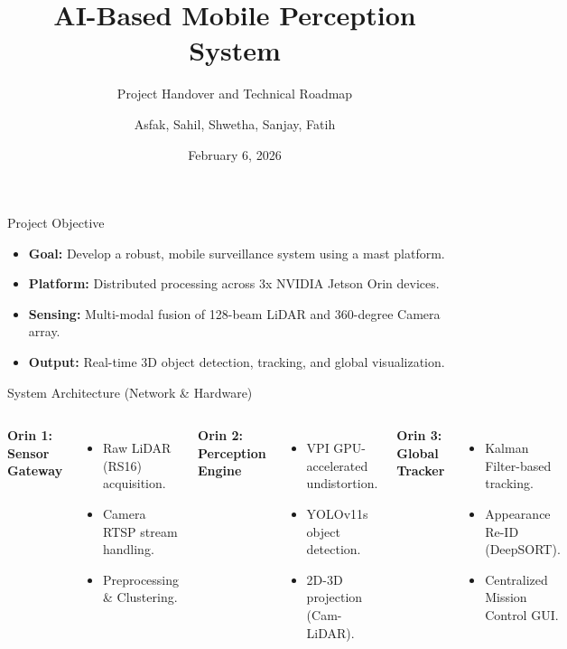 \documentclass[pdf, 10pt]{beamer}
\title[AI Mobile Mast Handover]{AI-Based Mobile Perception System}
\subtitle{Project Handover and Technical Roadmap}
\author[Batch 2025-26]{Asfak, Sahil, Shwetha, Sanjay, Fatih}
\institute[THI]{Technische Hochschule Ingolstadt}
\date[Feb 2026]{February 6, 2026}
\begin{document}
\begin{frame}
    \titlepage
\end{frame}

\begin{frame}{Project Objective}
    \begin{itemize}
        \item \textbf{Goal:} Develop a robust, mobile surveillance system using a mast platform.
        \item \textbf{Platform:} Distributed processing across 3x NVIDIA Jetson Orin devices.
        \item \textbf{Sensing:} Multi-modal fusion of 128-beam LiDAR and 360-degree Camera array.
        \item \textbf{Output:} Real-time 3D object detection, tracking, and global visualization.
    \end{itemize}
\end{frame}

\begin{frame}{System Architecture (Network & Hardware)}
    \begin{columns}
        \textbf{Orin 1: Sensor Gateway}
        \begin{itemize}
            \item Raw LiDAR (RS16) acquisition.
            \item Camera RTSP stream handling.
            \item Preprocessing & Clustering.
        \end{itemize}
        
        \textbf{Orin 2: Perception Engine}
        \begin{itemize}
            \item VPI GPU-accelerated undistortion.
            \item YOLOv11s object detection.
            \item 2D-3D projection (Cam-LiDAR).
        \end{itemize}

        \textbf{Orin 3: Global Tracker}
        \begin{itemize}
            \item Kalman Filter-based tracking.
            \item Appearance Re-ID (DeepSORT).
            \item Centralized Mission Control GUI.
        \end{itemize}
    \end{columns}
\end{frame}
\end{document}
